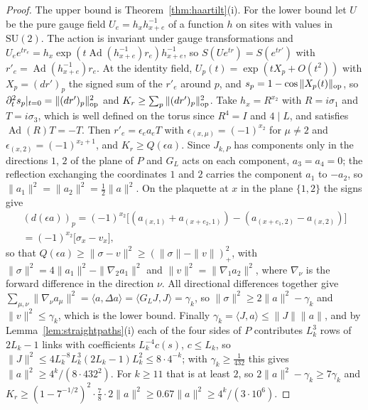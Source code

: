 \documentclass[11pt]{amsart}
\theoremstyle{definition}
\theoremstyle{remark}
\numberwithin{equation}{section}
\newcommand{\SU}{\mathrm{SU}}
\newcommand{\ip}[2]{\langle #1,#2\rangle}
\begin{document}
\begin{proof}
The upper bound is Theorem~\ref{thm:haartilt}(i). For the lower bound let
$U$ be the pure gauge field $U_e=h_xh_{x+e}^{-1}$ of a function $h$ on
sites with values in $\SU(2)$. The action is invariant under gauge
transformations and $U_ee^{tr_e}=h_x\exp(t\operatorname{Ad}(h_{x+e}^{-1})
r_e)h_{x+e}^{-1}$, so $S(Ue^{tr})=S(e^{tr'})$ with $r'_e=\operatorname{Ad}
(h_{x+e}^{-1})r_e$. At the identity field, $U_p(t)=\exp(tX_p+O(t^2))$ with
$X_p=(dr')_p$ the signed sum of the $r'_e$ around $p$, and $s_p=1-\cos\|
X_p(t)\|_{\rm op}$, so $\partial_t^2s_p|_{t=0}=\|(dr')_p\|_{\rm op}^2$ and
$K_r\ge\sum_p\|(dr')_p\|_{\rm op}^2$. Take $h_x=R^{x_2}$ with $R=i\sigma_1$
and $T=i\sigma_3$, which is well defined on the torus since $R^4=I$ and
$4\mid L$, and satisfies $\operatorname{Ad}(R)T=-T$. Then $r'_e=\epsilon_e
a_eT$ with $\epsilon_{(x,\mu)}=(-1)^{x_2}$ for $\mu\ne2$ and $\epsilon_{(x,
2)}=(-1)^{x_2+1}$, and $K_r\ge Q(\epsilon a)$. Since $J_{k,P}$ has
components only in the directions $1$, $2$ of the plane of $P$ and $G_L$
acts on each component, $a_3=a_4=0$; the reflection exchanging the
coordinates $1$ and $2$ carries the component $a_1$ to $-a_2$, so $\|a_1\|^2
=\|a_2\|^2=\frac12\|a\|^2$. On the plaquette at $x$ in the plane $\{1,2\}$
the signs give
\begin{multline*}
(d(\epsilon a))_p=(-1)^{x_2}\bigl[(a_{(x,1)}+a_{(x+e_2,1)})-(a_{(x+e_1,2)}
-a_{(x,2)})\bigr]\\
=(-1)^{x_2}\bigl[\sigma_x-v_x\bigr],
\end{multline*}
so that $Q(\epsilon a)\ge\|\sigma-v\|^2\ge(\|\sigma\|-\|v\|)_+^2$, with
$\|\sigma\|^2=4\|a_1\|^2-\|\nabla_2a_1\|^2$ and $\|v\|^2=\|\nabla_1a_2\|^2$,
where $\nabla_\nu$ is the forward difference in the direction $\nu$. All
directional differences together give $\sum_{\mu,\nu}\|\nabla_\nu a_\mu\|^2
=\ip{a}{\Delta a}=\ip{G_LJ}{J}=\gamma_k$, so $\|\sigma\|^2\ge2\|a\|^2-
\gamma_k$ and $\|v\|^2\le\gamma_k$, which is the lower bound. Finally
$\gamma_k=\ip{J}{a}\le\|J\|\|a\|$, and by Lemma~\ref{lem:straightpaths}(i)
each of the four sides of $P$ contributes $L_k^3$ rows of $2L_k-1$ links
with coefficients $L_k^{-4}c(s)$, $c\le L_k$, so $\|J\|^2\le4L_k^{-8}L_k^3
(2L_k-1)L_k^2\le8\cdot4^{-k}$; with $\gamma_k\ge\frac1{432}$ this gives
$\|a\|^2\ge4^k/(8\cdot432^2)$. For $k\ge11$ that is at least $2$, so
$2\|a\|^2-\gamma_k\ge7\gamma_k$ and $K_r\ge(1-7^{-1/2})^2\cdot\frac78\cdot
2\|a\|^2\ge0.67\|a\|^2\ge4^k/(3\cdot10^6)$.
\end{proof}
\end{document}
